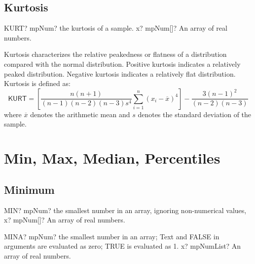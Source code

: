 \subsection{Kurtosis}


\begin{mpFunctionsExtract}
	\mpWorksheetFunctionOneNotImplemented
	{KURT? mpNum? the kurtosis of a sample.}
	{x? mpNum[]? An array of real numbers.}
\end{mpFunctionsExtract}

\vspace{0.3cm}
Kurtosis characterizes the relative peakedness or flatness of a distribution compared with the normal distribution. Positive kurtosis indicates a relatively peaked distribution. Negative kurtosis indicates a relatively flat distribution. Kurtosis is defined as:
\begin{equation}
	\textsf{KURT} = \left[\frac{n(n+1)}{(n-1)(n-2)(n-3) s^4}\sum_{i=1}^n (x_i-\overline{x})^4\right]  - \frac{3(n-1)^2}{(n-2)(n-3)}
\end{equation}
where $\overline{x}$ denotes the arithmetic mean and $s$ denotes the standard deviation of the sample.










\newpage
\section{Min, Max, Median, Percentiles}

\subsection{Minimum}

\begin{mpFunctionsExtract}
	\mpWorksheetFunctionOneNotImplemented
	{MIN? mpNum? the smallest number in an array, ignoring non-numerical values,}
	{x? mpNum[]? An array of real numbers.}
\end{mpFunctionsExtract}


\vspace{0.6cm}
\begin{mpFunctionsExtract}
	\mpWorksheetFunctionOneNotImplemented
	{MINA? mpNum? the smallest number in an array; Text and FALSE in arguments are evaluated as zero; TRUE is evaluated as 1.}
	{x? mpNumList? An array of real numbers.}
\end{mpFunctionsExtract}






